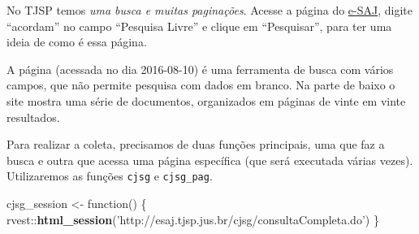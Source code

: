 \documentclass[]{book}
\newenvironment{Shaded}{\begin{snugshade}}{\end{snugshade}}
\newcommand{\KeywordTok}[1]{\textcolor[rgb]{0.13,0.29,0.53}{\textbf{{#1}}}}
\newcommand{\DataTypeTok}[1]{\textcolor[rgb]{0.13,0.29,0.53}{{#1}}}
\newcommand{\DecValTok}[1]{\textcolor[rgb]{0.00,0.00,0.81}{{#1}}}
\newcommand{\StringTok}[1]{\textcolor[rgb]{0.31,0.60,0.02}{{#1}}}
\newcommand{\OtherTok}[1]{\textcolor[rgb]{0.56,0.35,0.01}{{#1}}}
\newcommand{\NormalTok}[1]{{#1}}
\begin{document}
No TJSP temos \emph{uma busca e muitas paginações}. Acesse a página do
\href{http://esaj.tjsp.jus.br/cjsg/consultaCompleta.do}{e-SAJ}, digite
``acordam'' no campo ``Pesquisa Livre'' e clique em ``Pesquisar'', para
ter uma ideia de como é essa página.

A página (acessada no dia 2016-08-10) é uma ferramenta de busca com
vários campos, que não permite pesquisa com dados em branco. Na parte de
baixo o site mostra uma série de documentos, organizados em páginas de
vinte em vinte resultados.

Para realizar a coleta, precisamos de duas funções principais, uma que
faz a busca e outra que acessa uma página específica (que será executada
várias vezes). Utilizaremos as funções \texttt{cjsg} e
\texttt{cjsg\_pag}.

\begin{Shaded}
\begin{Highlighting}[]
\NormalTok{cjsg_session <-}\StringTok{ }\NormalTok{function() \{}
  \NormalTok{rvest::}\KeywordTok{html_session}\NormalTok{(}\StringTok{'http://esaj.tjsp.jus.br/cjsg/consultaCompleta.do'}\NormalTok{)}
\NormalTok{\}}
\end{Highlighting}
\end{Shaded}

\begin{Shaded}
\end{Shaded}
\end{document}
